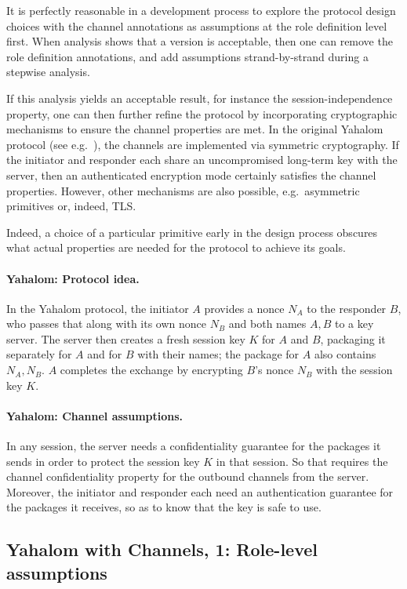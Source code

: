 It is perfectly reasonable in a development process to explore the
protocol design choices with the channel annotations as assumptions at
the role definition level first.  When analysis shows that a version
is acceptable, then one can remove the role definition annotations,
and add assumptions strand-by-strand during a stepwise analysis.

If this analysis yields an acceptable result, for instance the
session-independence property, one can then further refine the
protocol by incorporating cryptographic mechanisms to ensure the
channel properties are met.  In the original Yahalom protocol (see
e.g.~\cite{Paulson97c}), the channels are implemented via symmetric
cryptography.  If the initiator and responder each share an
uncompromised long-term key with the server, then an authenticated
encryption mode certainly satisfies the channel properties.  However,
other mechanisms are also possible, e.g.~asymmetric primitives or,
indeed, TLS.

Indeed, a choice of a particular primitive early in the design process
obscures what actual properties are needed for the protocol to achieve
its goals.

\paragraph{Yahalom:  Protocol idea.}  In the Yahalom protocol, the
initiator $A$ provides a nonce $N_A$ to the responder $B$, who passes
that along with its own nonce $N_B$ and both names $A,B$ to a key
server.  The server then creates a fresh session key $K$ for $A$ and
$B$, packaging it separately for $A$ and for $B$ with their names; the
package for $A$ also contains $N_A,N_B$.  $A$ completes the exchange
by encrypting $B$'s nonce $N_B$ with the session key $K$.

\paragraph{Yahalom:  Channel assumptions.}  In any session, the server
needs a confidentiality guarantee for the packages it sends in order
to protect the session key $K$ in that session.  So that requires the
channel confidentiality property for the outbound channels from the
server.  Moreover, the initiator and responder each need an
authentication guarantee for the packages it receives, so as to know
that the key is safe to use.

\subsection{Yahalom with Channels, 1:  Role-level assumptions}
\label{sec:channels:state:ch:role:level}

